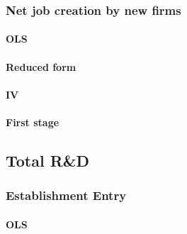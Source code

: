 \documentclass[7pt,english]{article}
\theoremstyle{remark}
\begin{document}
\newpage
\subsubsection{Net job creation by new firms}
\paragraph{OLS}
\begin{table}[h]
	
\end{table}

\newpage
\paragraph{Reduced form}
\begin{table}[h]
	
\end{table}

\paragraph{IV}
\begin{table}[h]
	
\end{table}

\paragraph{First stage}
\begin{table}[h]
	
\end{table}

\newpage
\subsection{Total R\&D}

\subsubsection{Establishment Entry}

\paragraph{OLS}
\begin{table}[h]
	
\end{table}

\newpage
\end{document}
